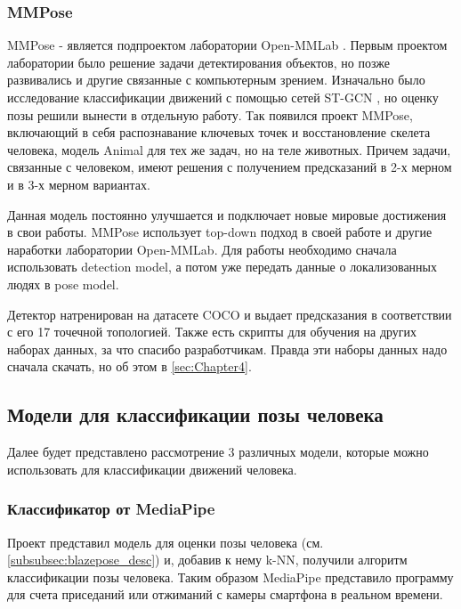 \subsubsection{MMPose}
\label{subsubsec:mmpose_desc}

MMPose - является подпроектом лаборатории Open-MMLab \cite{mmpose2020}. Первым проектом лаборатории было решение задачи детектирования объектов, но позже развивались и другие связанные с компьютерным зрением. Изначально было исследование классификации движений с помощью сетей ST-GCN \cite{STGCN}, но оценку позы решили вынести в отдельную работу. Так появился проект MMPose, включающий в себя распознавание ключевых точек и восстановление скелета человека, модель Animal для тех же задач, но на теле животных. Причем задачи, связанные с человеком, имеют решения с получением предсказаний в 2-х мерном и в 3-х мерном вариантах.

Данная модель постоянно улучшается и подключает новые мировые достижения в свои работы. MMPose использует top-down подход в своей работе и другие наработки лаборатории Open-MMLab. Для работы необходимо сначала использовать detection model, а потом уже передать данные о локализованных людях в pose model.

Детектор натренирован на датасете COCO и выдает предсказания в соответствии с его 17 точечной топологией. Также есть скрипты для обучения на других наборах данных, за что спасибо разработчикам. Правда эти наборы данных надо сначала скачать, но об этом в \autoref{sec:Chapter4}.
\hfill \break






\subsection{Модели для классификации позы человека}
\label{subsec:pose_classification_models}

Далее будет представлено рассмотрение 3 различных модели, которые можно использовать для классификации движений человека.



\subsubsection{Классификатор от MediaPipe}
\label{subsubsec:mp_classificator_desc}

Проект представил модель для оценки позы человека (см. \autoref{subsubsec:blazepose_desc}) и, добавив к нему k-NN, получили алгоритм классификации позы человека. Таким образом MediaPipe представило программу для счета приседаний или отжиманий с камеры смартфона в реальном времени. \cite{mediapipe_cls}


